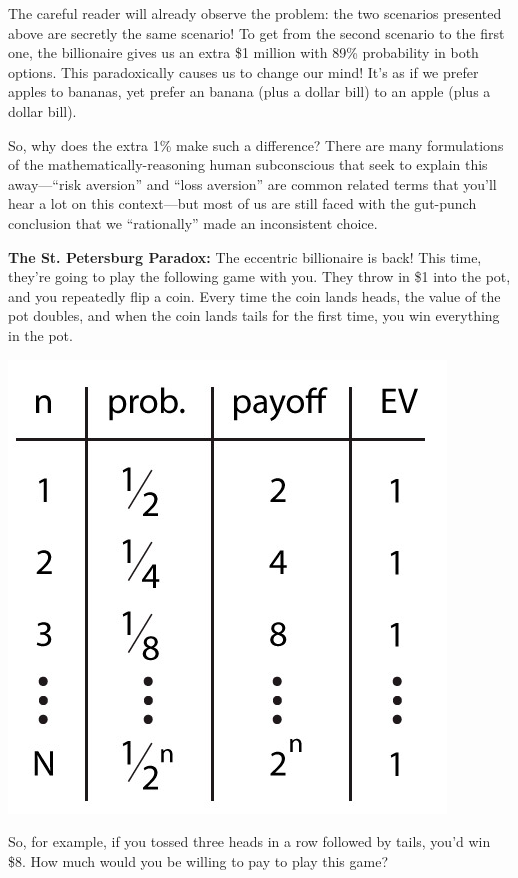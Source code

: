 \documentclass{article}
\begin{document}
The careful reader will already observe the problem: the two scenarios presented above are secretly the same scenario!
To get from the second scenario to the first one, the billionaire gives us an extra \$1 million with 89\% probability in both options. This paradoxically causes us to change our mind! It's as if we prefer apples to bananas, yet prefer an banana (plus a dollar bill) to an apple (plus a dollar bill).

So, why does the extra 1\% make such a difference? There are many formulations of the mathematically-reasoning human subconscious that seek to explain this away---``risk aversion'' and ``loss aversion'' are common related terms that you'll hear a lot on this context---but most of us are still faced with the gut-punch conclusion that we ``rationally'' made an inconsistent choice.

\textbf{The St. Petersburg Paradox:}
The eccentric billionaire is back! This time, they're going to play the following game with you. They throw in \$1 into the pot, and you repeatedly flip a coin. Every time the coin lands heads, the value of the pot doubles, and when the coin lands tails for the first time, you win everything in the pot.

\begin{center}
    \includegraphics[scale=0.6]{images/st_petersberg.png}
\end{center}

So, for example, if you tossed three heads in a row followed by tails, you'd win \$8.
How much would you be willing to pay to play this game?
\end{document}

